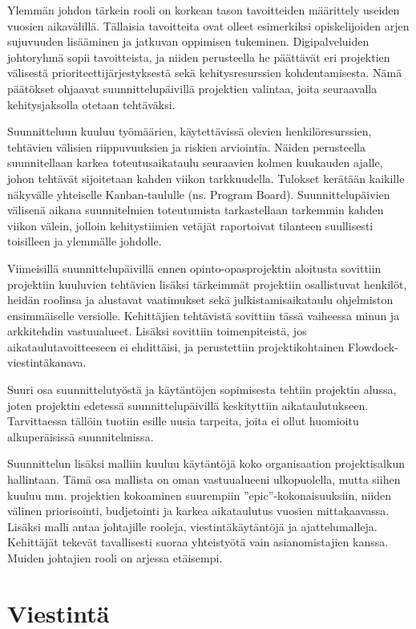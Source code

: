 \documentclass[11pt]{article}
\begin{document}
Ylemmän johdon tärkein rooli on korkean tason tavoitteiden määrittely useiden
vuosien aikavälillä. Tällaisia tavoitteita ovat olleet esimerkiksi
opiskelijoiden arjen sujuvuuden lisää\-minen ja jatkuvan oppimisen tukeminen.
Digipalveluiden johtoryhmä sopii tavoitteista, ja niiden perusteella he
päättävät eri projektien välisestä prioriteetti\-jär\-jes\-tyksestä sekä
kehitysresurssien kohdentamisesta. Nämä päätökset ohjaavat suunnittelupäivillä
projektien valintaa, joita seuraavalla kehitysjaksolla otetaan
tehtäväksi.

Suunnitteluun kuuluu työmäärien, käytettävissä olevien henkilöresurssien,
tehtävien väli\-sien riippuvuuksien ja riskien arviointia. Näiden perusteella
suunnitellaan karkea toteutus\-aika\-taulu seuraavien kolmen kuukauden ajalle,
johon tehtävät sijoitetaan kahden viikon tarkkuudella.  Tulokset kerätään
kaikille näkyvälle yhtei\-selle Kanban-taululle (ns. Program Board).
Suunnittelupäivien välisenä aikana suunnitelmien toteutumista
tarkastellaan tar\-kemmin kahden viikon välein, jolloin kehitystii\-mien
vetä\-jät raportoivat tilanteen suullisesti toisilleen ja ylemmälle johdolle.

Viimeisillä suunnittelupäivillä ennen opinto-opasprojektin aloitusta sovittiin projektiin
kuuluvien tehtävien lisäk\-si tärkeimmät projektiin osallistuvat henkilöt,
heidän roolinsa ja alustavat vaatimukset sekä julkistamis\-aikataulu ohjelmiston
ensimmäiselle versiolle. Kehittäjien tehtävistä sovittiin tässä vaiheessa minun
ja arkkitehdin vastuualueet. Lisäksi sovittiin toimenpiteistä,
jos aikataulutavoitteeseen ei ehdittäisi, ja perustettiin projektikohtainen
Flowdock-viestintäkanava.

Suuri osa suunnittelutyöstä ja käytäntöjen sopimisesta tehtiin projektin alussa, joten
projektin edetessä suunnittelupäivillä keskityttiin aikataulutukseen.
Tarvittaessa tällöin tuotiin esille uusia tarpeita, joita ei ollut huomioitu
alkuperäisissä suun\-nitelmissa.

Suunnittelun lisäksi malliin kuuluu käytäntöjä koko organisaation projektisalkun hallintaan.
Tämä osa mallista on oman vastuualueeni ulkopuolella, mutta siihen kuuluu mm.
projektien kokoaminen suurempiin ''epic''-kokonaisuuksiin, niiden välinen
priorisointi, budjetointi ja karkea aikataulutus vuosien mittakaavassa. Lisäksi
malli antaa johtajille rooleja, vies\-tintäkäytäntöjä ja ajattelumalleja.
Kehittäjät tekevät tavallisesti suoraa yhteistyötä vain asianomistajien kanssa.
Muiden johtajien rooli on arjessa etäisempi.

\section{Viestintä}
\end{document}
